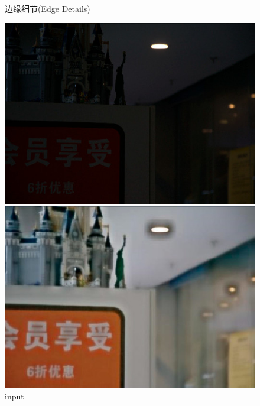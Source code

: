 \documentclass[CJK,aspectratio=169]{beamer}  %
\begin{document}
\begin{frame}
\begin{figure}
\begin{minipage}{.4\columnwidth}
\begin{itemize}
					 \yahei 边缘细节(Edge Details)
				\end{itemize}
			\end{minipage}
			\begin{minipage}{.58\columnwidth}
				\setlength{\abovecaptionskip}{-0.05cm}
				\centering 
				\begin{minipage}{0.17\columnwidth}
					\includegraphics[width=\linewidth]{picture/LLIE/VE-LOL-L/input}
					\caption*{\tiny input \\ \quad }
					\label{fig: input}
				\end{minipage}
				\begin{minipage}{0.17\columnwidth}
					\includegraphics[width=\linewidth]{picture/LLIE/VE-LOL-L/LLNet}

\end{minipage}
\end{minipage}
\end{figure}
\end{frame}
\end{document}
